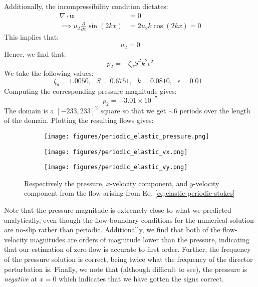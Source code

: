 \documentclass[reqno]{article}
\begin{document}
Additionally, the incompressibility condition dictates:
\begin{equation}
  \begin{split}
    \nabla \cdot \mathbf{u} &= 0 \\
    \implies u_2 \frac{\partial}{\partial x} \sin(2kx)
                            &= 2 u_2 k \cos(2kx)
                              = 0
  \end{split}
\end{equation}
This implies that:
\begin{equation}
  u_2 = 0
\end{equation}
Hence, we find that:
\begin{equation}
  p_2 = - \zeta_d S^2 k^2 \epsilon^2
\end{equation}
We take the following values:
\begin{equation}
  \zeta_d = 1.0050, \:\:\:
  S = 0.6751, \:\:\:
  k = 0.0810, \:\:\:
  \epsilon = 0.01 \:\:\:
\end{equation}
Computing the corresponding pressure magnitude gives:
\begin{equation}
  p_2 = -3.01 \times 10^{-7}
\end{equation}
The domain is a $[-233, 233]^2$ square so that we get $\sim 6$ periods over the
length of the domain.
Plotting the resulting flows gives:
\begin{figure}[h] 
  \centering
  \begin{subfigure}{0.45\textwidth}
    \texttt{[image: figures/periodic\_elastic\_pressure.png]}
    \caption{}
    \label{fig:periodic-elastic-pressure}
  \end{subfigure}
  \hfill
  \begin{subfigure}{0.45\textwidth}
    \texttt{[image: figures/periodic\_elastic\_vx.png]}
    \caption{}
    \label{fig:periodic-elastic-vx}
  \end{subfigure}
  \begin{subfigure}{0.45\textwidth}
    \texttt{[image: figures/periodic\_elastic\_vy.png]}
    \caption{}
    \label{fig:periodic-elastic-vy}
  \end{subfigure}
  \caption{Respectively the pressure, $x$-velocity component, and $y$-velocity
    component from the flow arising from Eq. \eqref{eq:elastic-periodic-stokes}}
  \label{fig:periodic-elastic-plot}
\end{figure}
Note that the pressure magnitude is extremely close to what we predicted
analytically, even though the flow boundary conditions for the numerical
solution are no-slip rather than periodic.
Additionally, we find that both of the flow-velocity magnitudes are orders of
magnitude lower than the pressure, indicating that our estimation of zero flow
is accurate to first order.
Further, the frequency of the pressure solution is correct, being twice what the
frequency of the director perturbation is.
Finally, we note that (although difficult to see), the pressure is
\textit{negative} at $x = 0$ which indicates that we have gotten the signs correct.
\end{document}
